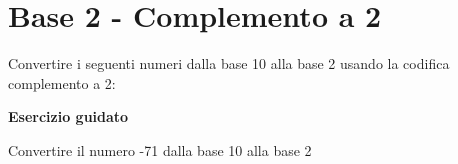 \documentclass[11pt,fleqn]{book}
\begin{document}

\newpage

\section{Base 2 - Complemento a 2}

Convertire i seguenti numeri dalla base 10 alla base 2 usando la codifica complemento a 2:

\begin{esercizio}[1]
    \textbf{Esercizio guidato}

    Convertire il numero -71 dalla base 10 alla base 2

    \immediate{}
    

\end{esercizio}










\end{document}
